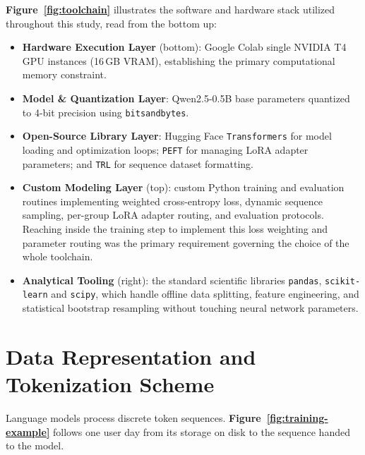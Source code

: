 \textbf{Figure~\ref{fig:toolchain}} illustrates the software and hardware stack utilized throughout this study, read from the bottom up:



\begin{itemize}
  \item \textbf{Hardware Execution Layer} (bottom): Google Colab single NVIDIA T4 GPU instances (16\,GB VRAM), establishing the primary computational memory constraint.
  \item \textbf{Model \& Quantization Layer}: Qwen2.5-0.5B base parameters quantized to 4-bit precision using \texttt{bitsandbytes}.
  \item \textbf{Open-Source Library Layer}: Hugging Face \texttt{Transformers} for model loading and optimization loops; \texttt{PEFT} for managing LoRA adapter parameters; and \texttt{TRL} for sequence dataset formatting.
  \item \textbf{Custom Modeling Layer} (top): custom Python training and evaluation routines implementing weighted cross-entropy loss, dynamic sequence sampling, per-group LoRA adapter routing, and evaluation protocols. Reaching inside the training step to implement this loss weighting and parameter routing was the primary requirement governing the choice of the whole toolchain.
  \item \textbf{Analytical Tooling} (right): the standard scientific libraries \texttt{pandas}, \texttt{scikit-learn} and \texttt{scipy}, which handle offline data splitting, feature engineering, and statistical bootstrap resampling \textbf{\cite{efron1993bootstrap}} without touching neural network parameters.
\end{itemize}

\section{Data Representation and Tokenization Scheme}

Language models process discrete token sequences. \textbf{Figure~\ref{fig:training-example}} follows one user day from its storage on disk to the sequence handed to the model.



